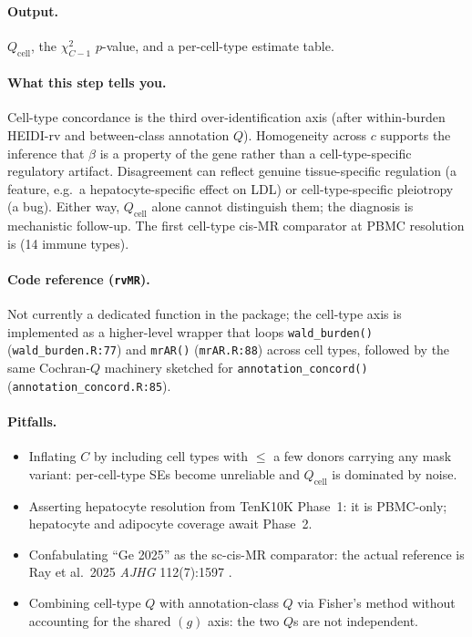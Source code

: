 \documentclass[11pt]{article}
\begin{document}
\paragraph{Output.} $Q_{\mathrm{cell}}$, the $\chi^2_{C-1}$ $p$-value, and a per-cell-type estimate table.

\paragraph{What this step tells you.} Cell-type concordance is the third over-identification axis (after within-burden HEIDI-rv and between-class annotation $Q$). Homogeneity across $c$ supports the inference that $\beta$ is a property of the gene rather than a cell-type-specific regulatory artifact. Disagreement can reflect genuine tissue-specific regulation (a feature, e.g.\ a hepatocyte-specific effect on LDL) or cell-type-specific pleiotropy (a bug). Either way, $Q_{\mathrm{cell}}$ alone cannot distinguish them; the diagnosis is mechanistic follow-up. The first cell-type cis-MR comparator at PBMC resolution is \citet{Ray2025} (14 immune types).

\paragraph{Code reference (\texttt{rvMR}).} Not currently a dedicated function in the package; the cell-type axis is implemented as a higher-level wrapper that loops \verb|wald_burden()| (\verb|wald_burden.R:77|) and \verb|mrAR()| (\verb|mrAR.R:88|) across cell types, followed by the same Cochran-$Q$ machinery sketched for \verb|annotation_concord()| (\verb|annotation_concord.R:85|).

\paragraph{Pitfalls.}
\begin{itemize}
\item Inflating $C$ by including cell types with $\le$ a few donors carrying any mask variant: per-cell-type SEs become unreliable and $Q_{\mathrm{cell}}$ is dominated by noise.
\item Asserting hepatocyte resolution from TenK10K Phase~1: it is PBMC-only; hepatocyte and adipocyte coverage await Phase~2.
\item Confabulating ``Ge 2025'' as the sc-cis-MR comparator: the actual reference is Ray et al.\ 2025 \emph{AJHG} 112(7):1597 \citep{Ray2025}.
\item Combining cell-type $Q$ with annotation-class $Q$ via Fisher's method without accounting for the shared $(g)$ axis: the two $Q$s are not independent.
\end{itemize}
\end{document}
